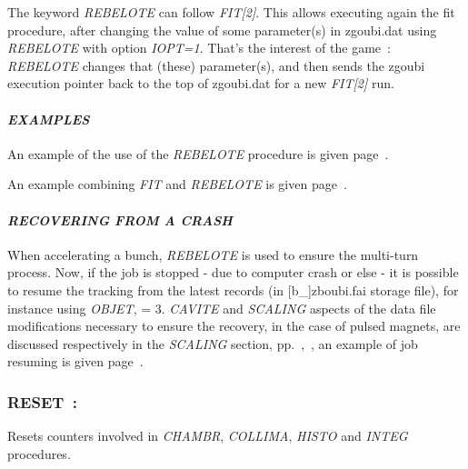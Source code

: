 {\noindent The keyword  \textsl{REBELOTE}  can follow   \textsl{FIT[2]}.  This allows executing again 
the fit procedure,  after changing the value of some parameter(s) in zgoubi.dat using \textsl{REBELOTE} with 
option \textsl{IOPT=1}. 
That's the interest of the game~: \textsl{REBELOTE}  changes that (these) parameter(s), and then sends the 
zgoubi execution pointer back to the top of zgoubi.dat for a new  \textsl{FIT[2]}  run. 


\bigskip

\paragraph{\textsl{EXAMPLES}} 

\noindent  An example of the use of the \textsl{REBELOTE} procedure is given page~\pageref{ExaREBELOTE}. 

\bigskip

\noindent  An example combining \textsl{FIT} and \textsl{REBELOTE} is given page~\pageref{ExaFITREBELOTE}. 



\paragraph{\textsl{RECOVERING FROM A CRASH}}

\noindent When accelerating a bunch, \textsl{REBELOTE} is used to ensure the multi-turn process. 
Now, if the job is stopped - due to computer crash or else -  it is possible to resume the tracking 
from the latest records (in [b\_]zboubi.fai storage file), for instance using \textsl{OBJET}, \KOBJ = 3.
  \textsl{CAVITE} and  \textsl{SCALING} aspects of the data file modifications necessary to ensure the recovery, 
in the case of pulsed magnets,  are 
discussed respectively in the \textsl{SCALING} section, pp.~\pageref{SCALING},~\pageref{CrashSCALING}, 
 an example of job resuming is given  page~\pageref{ExaOBJ3Recovery}. 








\newpage

\subsubsection{RESET~: \RESETTitl } \label{RESET} 
\medskip 

 \noindent Resets counters involved  in \textsl{CHAMBR}, \textsl{COLLIMA},   
  \textsl{HISTO} and \textsl{INTEG} procedures. 
 
}
